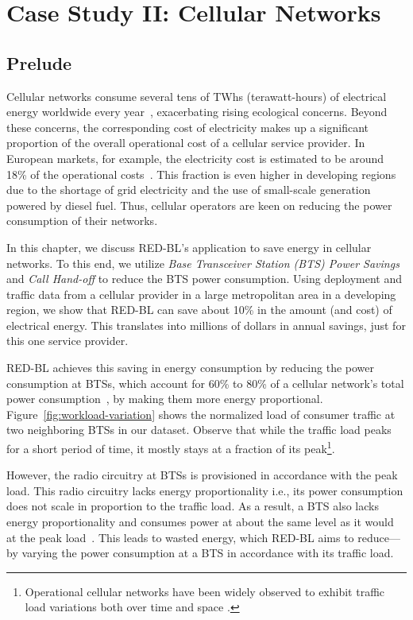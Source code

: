 \chapter{Case Study II: Cellular Networks}
\label{chap:casestudy2}
\section{Prelude}
Cellular networks consume several tens of TWhs (terawatt-hours) of electrical energy worldwide every year~\cite{Oh:Comm:2011}, exacerbating rising ecological concerns. Beyond these concerns, the corresponding cost of electricity makes up a significant proportion of the overall operational cost of a cellular service provider.
In European markets, for example, the electricity cost is
estimated to be around 18\% of the operational costs~\cite{Blume:2010:BLTJ:CellularPower}.
This fraction is even higher in developing regions due to the shortage of grid electricity and the use of small-scale generation powered by diesel fuel. Thus, cellular operators are keen on reducing the power consumption of their networks.

In this chapter, we discuss RED-BL's application to save energy in cellular networks. To this end, we utilize \textit{Base
Transceiver Station (BTS) Power Savings} and \textit{Call
Hand-off} to reduce the BTS power consumption. Using deployment
and traffic data from a cellular provider in a large metropolitan area in a developing region, we show that
RED-BL can save about 10\% in the amount (and cost) of electrical energy.
This translates into millions of dollars in annual savings, just for this one service provider.


RED-BL achieves this saving in energy consumption by reducing the power consumption at BTSs, which account for 60\% to 80\% of a cellular network's total power consumption~\cite{Oh:Comm:2011,Louhi:2007:BTSPower:INTELEC,Peng:2011:BTSSaving:Mobicom}, by making them more energy proportional.
Figure~\ref{fig:workload-variation} shows the normalized load of consumer traffic at two neighboring BTSs in our dataset.
Observe that while the traffic load peaks for a short period of time, it mostly stays at a fraction of its peak\footnote{Operational cellular networks have been widely observed to exhibit traffic load variations both over time and space \cite{Peng:2011:BTSSaving:Mobicom}.}.

However, the radio circuitry at BTSs is provisioned in accordance with the peak load.
This radio circuitry lacks energy proportionality i.e., its power consumption does not scale in proportion to the traffic load.
As a result, a BTS also lacks energy proportionality and consumes power at about the same level as it would at the peak load~\cite{Peng:2011:BTSSaving:Mobicom}. This leads to wasted energy, which RED-BL aims to reduce---by varying the power consumption at a BTS in accordance with its traffic load.

